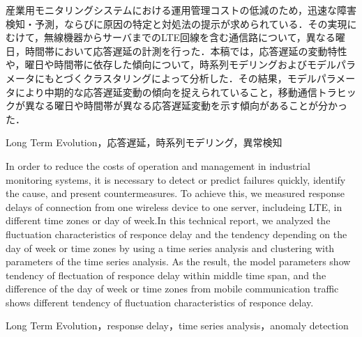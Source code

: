 \documentclass[technicalreport]{ieicej}
\begin{document}
\newcommand{\argmin}{\mathop{\rm arg~min}\limits}
\def \vector#1{\mbox{\boldmath $#1$}}

\begin{jabstract}
産業用モニタリングシステムにおける運用管理コストの低減のため，迅速な障害検知・予測，ならびに原因の特定と対処法の提示が求められている．その実現にむけて，無線機器からサーバまでのLTE回線を含む通信路について，異なる曜日，時間帯において応答遅延の計測を行った．本稿では，応答遅延の変動特性や，曜日や時間帯に依存した傾向について，時系列モデリングおよびモデルパラメータにもとづくクラスタリングによって分析した．その結果，モデルパラメータにより中期的な応答遅延変動の傾向を捉えられていること，移動通信トラヒックが異なる曜日や時間帯が異なる応答遅延変動を示す傾向があることが分かった．
\end{jabstract}
\begin{jkeyword}
Long Term Evolution，応答遅延，時系列モデリング，異常検知
\end{jkeyword}
\begin{eabstract}
In order to reduce the costs of operation and management in industrial monitoring systems, it is necessary to detect or predict failures quickly, identify the cause, and present countermeasures. To achieve this, we measured response delays of connection from one wireless device to one server, includeing LTE, in different time zones or day of week.In this technical report, we analyzed the fluctuation characteristics of responce delay and the tendency depending on the day of week or time zones by using a time series analysis and clustering with parameters of the time series analysis. As the result, the model parameters show tendency of flectuation of responce delay within middle time span, and the difference of the day of week or time zones from mobile communication traffic shows different tendency of fluctuation characteristics of responce delay.
\end{eabstract}
\begin{ekeyword}
Long Term Evolution，response delay，time series analysis，anomaly detection
\end{ekeyword}
\maketitle
\end{document}
